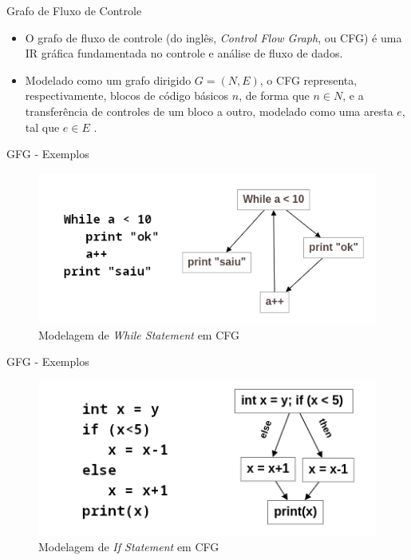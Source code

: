 \begin{frame}{Grafo de Fluxo de Controle}
    \begin{itemize}
        \item O grafo de fluxo de controle (do inglês, \textit{Control Flow Graph}, ou CFG) é uma IR gráfica fundamentada no controle e análise de fluxo de dados.
    
        \item Modelado como um grafo dirigido $G=(N,E)$, o CFG representa, respectivamente, blocos de código básicos $n$, de forma que $n \in N$, e a transferência de controles de um bloco a outro, modelado como uma aresta $e$, tal que $e \in E$ \cite{allen1970control}.
    \end{itemize}
\end{frame}

\begin{frame}{GFG - Exemplos}
    \begin{figure}
        \centering
        \includegraphics[width=.8\textwidth]{Figuras/cfg.png}
        \caption{Modelagem de \textit{While Statement} em CFG}
        \label{fig:enter-label}
    \end{figure}
\end{frame}

\begin{frame}{GFG - Exemplos}
    \begin{figure}
        \centering
        \includegraphics[width=.8\textwidth]{Figuras/cfg2.png}
        \caption{Modelagem de \textit{If Statement} em CFG}
        \label{fig:enter-label}
    \end{figure}
\end{frame}